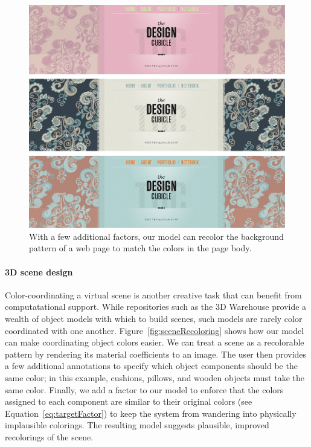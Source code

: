 \begin{figure}[ht]
\centering
\includegraphics[width=\columnwidth]{figs/webpageRecoloring}
\caption{With a few additional factors, our model can recolor the background pattern of a web page to match the colors in the page body.}
\label{fig:webpageRecoloring}
\vspace{-1.0em}
\end{figure}

\paragraph{3D scene design}
Color-coordinating a virtual scene is another creative task that can benefit from computatational support. While repositories such as the 3D Warehouse provide a wealth of object models with which to build scenes, such models are rarely color coordinated with one another. Figure~\ref{fig:sceneRecoloring} shows how our model can make coordinating object colors easier. We can treat a scene as a recolorable pattern by rendering its material coefficients to an image. The user then provides a few additional annotations to specify which object components should be the same color; in this example, cushions, pillows, and wooden objects must take the same color. Finally, we add a factor to our model to enforce that the colors assigned to each component are similar to their original colors (see Equation~\ref{eq:targetFactor}) to keep the system from wandering into physically implausible colorings. The resulting model suggests plausible, improved recolorings of the scene.

